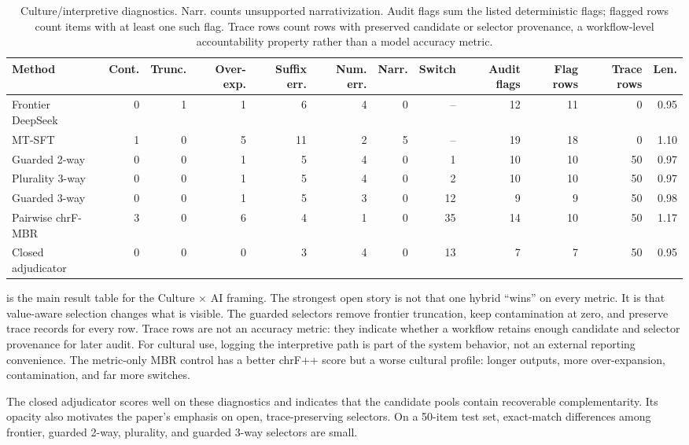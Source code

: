 \documentclass{article}
\begin{document}
\begin{table}[t]
\centering
\tiny
\setlength{\tabcolsep}{2pt}
\begin{tabularx}{\textwidth}{@{}Xrrrrrrrrrrr@{}}
\toprule
Method & Cont. & Trunc. & Over-exp. & Suffix err. & Num. err. & Narr. & Switch & Audit flags & Flag rows & Trace rows & Len. \\
\midrule
Frontier DeepSeek & 0 & 1 & 1 & 6 & 4 & 0 & -- & 12 & 11 & 0 & 0.95 \\
MT-SFT & 1 & 0 & 5 & 11 & 2 & 5 & -- & 19 & 18 & 0 & 1.10 \\
Guarded 2-way & 0 & 0 & 1 & 5 & 4 & 0 & 1 & 10 & 10 & 50 & 0.97 \\
Plurality 3-way & 0 & 0 & 1 & 5 & 4 & 0 & 2 & 10 & 10 & 50 & 0.97 \\
Guarded 3-way & 0 & 0 & 1 & 5 & 3 & 0 & 12 & 9 & 9 & 50 & 0.98 \\
Pairwise chrF-MBR & 3 & 0 & 6 & 4 & 1 & 0 & 35 & 14 & 10 & 50 & 1.17 \\
Closed adjudicator & 0 & 0 & 0 & 3 & 4 & 0 & 13 & 7 & 7 & 50 & 0.95 \\
\bottomrule
\end{tabularx}
\caption{Culture/interpretive diagnostics. Narr. counts unsupported narrativization. Audit flags sum the listed deterministic flags; flagged rows count items with at least one such flag. Trace rows count rows with preserved candidate or selector provenance, a workflow-level accountability property rather than a model accuracy metric.}
\label{tab:cultural}
\end{table}

 is the main result table for the Culture $\times$ AI framing. The strongest open story is not that one hybrid ``wins'' on every metric. It is that value-aware selection changes what is visible. The guarded selectors remove frontier truncation, keep contamination at zero, and preserve trace records for every row. Trace rows are not an accuracy metric: they indicate whether a workflow retains enough candidate and selector provenance for later audit. For cultural use, logging the interpretive path is part of the system behavior, not an external reporting convenience. The metric-only MBR control has a better chrF++ score but a worse cultural profile: longer outputs, more over-expansion, contamination, and far more switches.

The closed adjudicator scores well on these diagnostics and indicates that the candidate pools contain recoverable complementarity. Its opacity also motivates the paper's emphasis on open, trace-preserving selectors. On a 50-item test set, exact-match differences among frontier, guarded 2-way, plurality, and guarded 3-way selectors are small.
\end{document}
